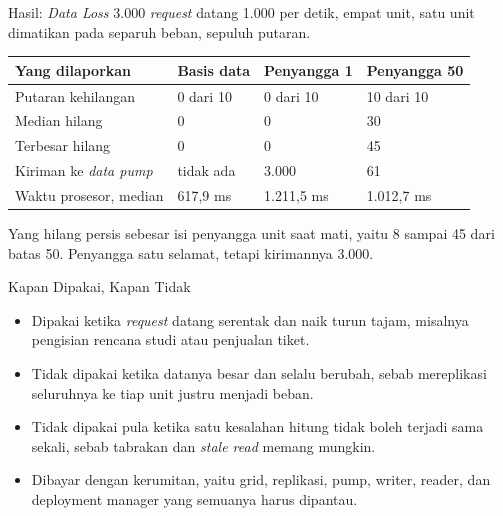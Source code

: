 \documentclass[aspectratio=169, table, 12pt]{beamer}
\begin{document}
\begin{frame}{{\Large Hasil: \textit{Data Loss}}}
  \vspace{6pt}
  {\small 3.000 \textit{request} datang 1.000 per detik, empat unit, satu unit
  dimatikan pada separuh beban, sepuluh putaran.}

  \vspace{6pt}
  \centering
  \small
  \begin{tabularx}{0.96\textwidth}{|X|l|l|l|}
    \hline
    \textbf{Yang dilaporkan} & \textbf{Basis data} & \textbf{Penyangga 1} & \textbf{Penyangga 50} \\
    \hline
    Putaran kehilangan & 0 dari 10 & 0 dari 10 & 10 dari 10 \\
    \hline
    Median hilang & 0 & 0 & 30 \\
    \hline
    Terbesar hilang & 0 & 0 & 45 \\
    \hline
    Kiriman ke \textit{data pump} & tidak ada & 3.000 & 61 \\
    \hline
    Waktu prosesor, median & 617,9 ms & 1.211,5 ms & 1.012,7 ms \\
    \hline
  \end{tabularx}

  \vspace{6pt}
  \raggedright
  {\small Yang hilang persis sebesar isi penyangga unit saat mati, yaitu 8
  sampai 45 dari batas 50. Penyangga satu selamat, tetapi kirimannya 3.000.}
\end{frame}

\begin{frame}{{\Large Kapan Dipakai, Kapan Tidak}}
  \vspace{10pt}
  \begin{itemize}\small
    \item Dipakai ketika \textit{request} datang serentak dan naik turun tajam,
          misalnya pengisian rencana studi atau penjualan tiket.
    \item Tidak dipakai ketika datanya besar dan selalu berubah, sebab
          mereplikasi seluruhnya ke tiap unit justru menjadi beban.
    \item Tidak dipakai pula ketika satu kesalahan hitung tidak boleh terjadi
          sama sekali, sebab tabrakan dan \textit{stale read} memang mungkin.
    \item Dibayar dengan kerumitan, yaitu grid, replikasi, pump, writer,
          reader, dan deployment manager yang semuanya harus dipantau.
  \end{itemize}
\end{frame}
\end{document}

